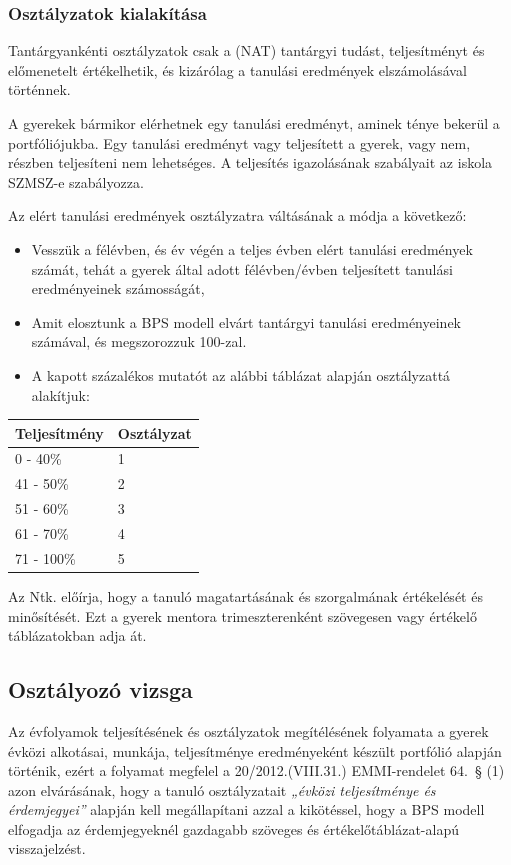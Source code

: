 \hypertarget{osztalyzatok-kialakitasa}{%
\subsubsection{Osztályzatok
kialakítása}\label{osztalyzatok-kialakitasa}}

Tantárgyankénti osztályzatok csak a (NAT) tantárgyi tudást,
teljesítményt és előmenetelt értékelhetik, és kizárólag a tanulási
eredmények elszámolásával történnek.

A gyerekek bármikor elérhetnek egy tanulási eredményt, aminek ténye
bekerül a portfóliójukba. Egy tanulási eredményt vagy teljesített a
gyerek, vagy nem, részben teljesíteni nem lehetséges. A teljesítés
igazolásának szabályait az iskola SZMSZ-e szabályozza.

Az elért tanulási eredmények osztályzatra váltásának a módja a
következő:

\begin{itemize}
\tightlist
\item
  Vesszük a félévben, és év végén a teljes évben elért tanulási
  eredmények számát, tehát a gyerek által adott félévben/évben
  teljesített tanulási eredményeinek számosságát,
\item
  Amit elosztunk a BPS modell elvárt tantárgyi tanulási eredményeinek
  számával, és megszorozzuk 100-zal.
\item
  A kapott százalékos mutatót az alábbi táblázat alapján osztályzattá
  alakítjuk:
\end{itemize}

\begin{longtable}[]{@{}ll@{}}
\toprule
Teljesítmény & Osztályzat\tabularnewline
\midrule
\endhead
0 - 40\% & 1\tabularnewline
41 - 50\% & 2\tabularnewline
51 - 60\% & 3\tabularnewline
61 - 70\% & 4\tabularnewline
71 - 100\% & 5\tabularnewline
\bottomrule
\end{longtable}

Az Ntk. előírja, hogy a tanuló magatartásának és szorgalmának
értékelését és minősítését. Ezt a gyerek mentora trimeszterenként
szövegesen vagy értékelő táblázatokban adja át.

\hypertarget{osztalyozo-vizsga}{%
\subsection{Osztályozó vizsga}\label{osztalyozo-vizsga}}

Az évfolyamok teljesítésének és osztályzatok megítélésének folyamata a
gyerek évközi alkotásai, munkája, teljesítménye eredményeként készült
portfólió alapján történik, ezért a folyamat megfelel a
20/2012.(VIII.31.) EMMI-rendelet 64.~§ (1) azon elvárásának, hogy a
tanuló osztályzatait \emph{„évközi teljesítménye és érdemjegyei''}
alapján kell megállapítani azzal a kikötéssel, hogy a BPS modell
elfogadja az érdemjegyeknél gazdagabb szöveges és értékelőtáblázat-alapú
visszajelzést.

